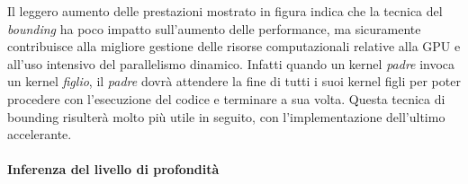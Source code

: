 \begin{figure}[H]
    \centering
    \caption{}
\end{figure}

Il leggero aumento delle prestazioni mostrato in figura indica che la tecnica
del \textit{bounding} ha poco impatto sull'aumento delle performance, ma
sicuramente contribuisce alla migliore gestione delle risorse computazionali
relative alla GPU e all'uso intensivo del parallelismo dinamico. Infatti
quando un kernel \textit{padre} invoca un kernel \textit{figlio},
il \textit{padre} dovrà attendere la fine di tutti i suoi kernel figli per
poter procedere con l'esecuzione del codice e terminare a sua volta.
Questa tecnica di bounding risulterà molto più utile in seguito, con
l'implementazione dell'ultimo accelerante.

\paragraph{Inferenza del livello di profondità}


